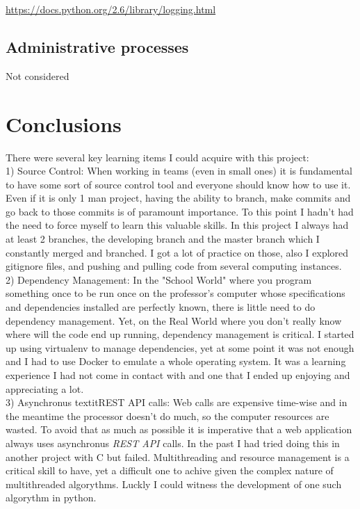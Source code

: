 \documentclass[10pt]{article}
\begin{document}
\href{https://docs.python.org/2.6/library/logging.html}{https://docs.python.org/2.6/library/logging.html}\\
 
 \subsection{Administrative processes}
 
 Not considered
 
\section{Conclusions}
There were several key learning items I could acquire with this project:\\

1) Source Control: When working in teams (even in small ones) it is fundamental to have some sort of source control tool and everyone should know how to use it. Even if it is only 1 man project, having the ability to branch, make commits and go back to those commits is of paramount importance. To this point I hadn't had the need to force myself to learn this valuable skills. In this project I always had at least 2 branches, the developing branch and the master branch which I constantly merged and branched. I got a lot of practice on those, also I explored gitignore files, and pushing and pulling code from several computing instances.\\

2) Dependency Management: In the "School World" where you program something once to be run once on the professor's computer whose specifications and dependencies installed are perfectly known, there is little need to do dependency management. Yet, on the Real World where you don't really know where will the code end up running, dependency management is critical. I started up using virtualenv to manage dependencies, yet at some point it was not enough and I had to use Docker to emulate a whole operating system. It was a learning experience I had not come in contact with and one that I ended up enjoying and appreciating a lot.\\

3) Asynchronus textit{REST API} calls: Web calls are expensive time-wise and in the meantime the processor doesn't do much, so the computer resources are wasted. To avoid that as much as possible it is imperative that a web application always uses asynchronus \textit{REST API} calls. In the past I had tried doing this in another project with C but failed. Multithreading and resource management is a critical skill to have, yet a difficult one to achive given the complex nature of multithreaded algorythms. Luckly I could witness the development of one such algorythm in python.\\
\end{document}
